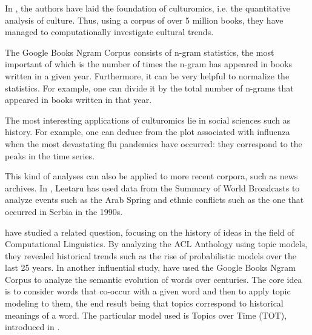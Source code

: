 
In , the authors have laid the foundation of culturomics, i.e. the quantitative analysis of culture. Thus, using a corpus of over 5 million books, they have managed to computationally investigate cultural trends.

The Google Books Ngram Corpus consists of n-gram statistics, the most important of which is the number of times the n-gram has appeared in books written in a given year. Furthermore, it can be very helpful to normalize the statistics. For example, one can divide it by the total number of n-grams that appeared in books written in that year.

The most interesting applications of culturomics lie in social sciences such as history. For example, one can deduce from the plot associated with influenza when the most devastating flu pandemics have occurred: they correspond to the peaks in the time series.

This kind of analyses can also be applied to more recent corpora, such as news archives. In , Leetaru has used data from the Summary of World Broadcasts to analyze events such as the Arab Spring and ethnic conflicts such as the one that occurred in Serbia in the 1990s.

 have studied a related question, focusing on the history of ideas in the field of Computational Linguistics. By analyzing the ACL Anthology using topic models, they revealed historical trends such as the rise of probabilistic models over the last 25 years. In another influential study,  have used the Google Books Ngram Corpus to analyze the semantic evolution of words over centuries. The core idea is to consider words that co-occur with a given word and then to apply topic modeling to them, the end result being that topics correspond to historical meanings of a word. The particular model used is Topics over Time (TOT), introduced in .
